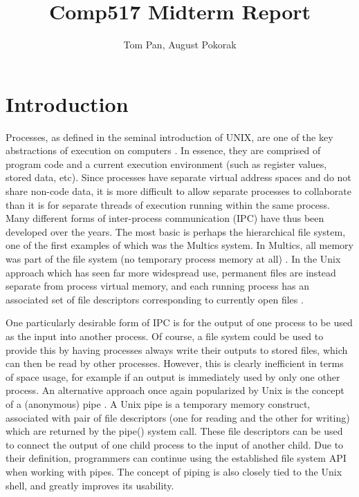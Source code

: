 \usepackage{filecontents}

\usepackage{listings}

\title{Comp517 Midterm Report}
\author{Tom Pan, August Pokorak}



\maketitle

\section{Introduction}

Processes, as defined in the seminal introduction of UNIX, are one of the key abstractions of execution on computers \cite{unix1}.  In essence, they are comprised of program code and a current execution environment (such as register values, stored data, etc).  Since processes have separate virtual address spaces and do not share non-code data, it is more difficult to allow separate processes to collaborate than it is for separate threads of execution running within the same process.  Many different forms of inter-process communication (IPC) have thus been developed over the years.  The most basic is perhaps the hierarchical file system, one of the first examples of which was the Multics system.  In Multics, all memory was part of the file system (no temporary process memory at all) \cite{multics}. In the Unix approach which has seen far more widespread use, permanent files are instead separate from process virtual memory, and each running process has an associated set of file descriptors corresponding to currently open files \cite{unix1}.

One particularly desirable form of IPC is for the output of one process to be used as the input into another process. Of course, a file system could be used to provide this by having processes always write their outputs to stored files, which can then be read by other processes.  However, this is clearly inefficient in terms of space usage, for example if an output is immediately used by only one other process. An alternative approach once again popularized by Unix is the concept of a (anonymous) pipe \cite{unix1}.  A Unix pipe is a temporary memory construct, associated with pair of file descriptors (one for reading and the other for writing) which are returned by the pipe() system call. These file descriptors can be used to connect the output of one child process to the input of another child. Due to their definition, programmers can continue using the established file system API when working with pipes. The concept of piping is also closely tied to the Unix shell, and greatly improves its usability.


